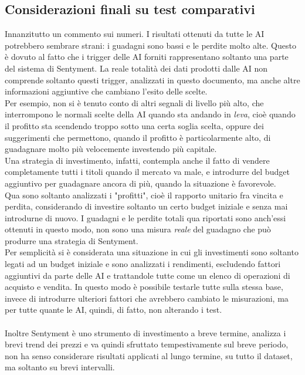 \documentclass[a4paper,12pt]{report}
\begin{document}
\begin{fig}
\section{Considerazioni finali su test comparativi}
Innanzitutto un commento sui numeri. I risultati ottenuti da tutte le AI potrebbero sembrare strani: i guadagni sono bassi e le perdite molto alte. Questo è dovuto al fatto che i trigger delle AI forniti rappresentano soltanto una parte del sistema di Sentyment. La reale totalità dei dati prodotti dalle AI non comprende soltanto questi trigger, analizzati in questo documento, ma anche altre informazioni aggiuntive che cambiano l'esito delle scelte.\\Per esempio, non si è tenuto conto di altri segnali di livello più alto, che interrompono le normali scelte della AI quando sta andando in \textit{leva}, cioè quando il profitto sta scendendo troppo sotto una certa soglia scelta, oppure dei suggerimenti che permettono, quando il profitto è particolarmente alto, di guadagnare molto più velocemente investendo più capitale.\\ Una strategia di investimento, infatti, contempla anche il fatto di vendere completamente tutti i titoli quando il mercato va male, e introdurre del budget aggiuntivo per guadagnare ancora di più, quando la situazione è favorevole.\\ Qua sono soltanto analizzati i "profitti", cioè il rapporto unitario fra vincita e perdita, considerando di investire soltanto un certo budget iniziale e senza mai introdurne di nuovo. I guadagni e le perdite totali qua riportati sono anch'essi ottenuti in questo modo, non sono una misura \textit{reale} del guadagno che può produrre una strategia di Sentyment.\\ Per semplicità si è considerata una situazione in cui gli investimenti sono soltanto legati ad un budget iniziale e sono analizzati i rendimenti, escludendo fattori aggiuntivi da parte delle AI e trattandole tutte come un elenco di operazioni di acquisto e vendita. In questo modo è possibile testarle tutte sulla stessa base, invece di introdurre ulteriori fattori che avrebbero cambiato le misurazioni, ma per tutte quante le AI, quindi, di fatto, non alterando i test.\\~\\
Inoltre Sentyment è uno strumento di investimento a breve termine, analizza i brevi trend dei prezzi e va quindi sfruttato tempestivamente sul breve periodo, non ha senso considerare risultati applicati al lungo termine, su tutto il dataset, ma soltanto su brevi intervalli.\\~\\

\end{fig}
\end{document}
